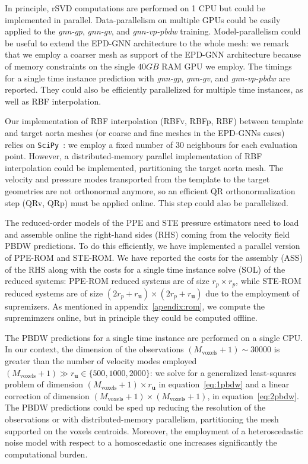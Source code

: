 In principle, rSVD computations are performed on 1 CPU but could be implemented in parallel. Data-parallelism on multiple GPUs could be easily applied to the \textit{gnn-gp}, \textit{gnn-gv}, and \textit{gnn-vp-pbdw} training. Model-parallelism could be useful to extend the EPD-GNN architecture to the whole mesh: we remark that we employ a coarser mesh as support of the EPD-GNN architecture because of memory constraints on the single $40GB$ RAM GPU we employ. The timings for a single time instance prediction with \textit{gnn-gp}, \textit{gnn-gv}, and \textit{gnn-vp-pbdw} are reported. They could also be efficiently parallelized for multiple time instances, as well as RBF interpolation.

Our implementation of RBF interpolation (RBFv, RBFp, RBF) between template and target aorta meshes (or coarse and fine meshes in the EPD-GNNs cases) relies on \texttt{SciPy}~\cite{2020SciPy-NMeth}: we employ a fixed number of $30$ neighbours for each evaluation point. However, a distributed-memory parallel implementation of RBF interpolation could be implemented, partitioning the target aorta mesh. The velocity and pressure modes transported from the template to the target geometries are not orthonormal anymore, so an efficient QR orthonormalization step (QRv, QRp) must be applied online. This step could also be parallelized.

The reduced-order models of the PPE and STE pressure estimators need to load and assemble online the right-hand sides (RHS) coming from the velocity field PBDW predictions. To do this efficiently, we have implemented a parallel version of PPE-ROM and STE-ROM. We have reported the costs for the assembly (ASS) of the RHS along with the costs for a single time instance solve (SOL) of the reduced systems: PPE-ROM reduced systems are of size $r_p\times r_p$, while STE-ROM reduced systems are of size $(2r_p+r_{\mathbf u})\times (2r_p+r_{\mathbf u})$ due to the employment of supremizers. As mentioned in appendix~\ref{apendix:rom}, we compute the supremimzers online, but in principle they could be computed offline.

The PBDW predictions for a single time instance are performed on a single CPU. In our context, the dimension of the observations $(M_{\text{voxels}}+1)\sim30000$ is greater than the number of velocity modes employed $(M_{\text{voxels}}+1)\gg r_{\mathbf u}\in\{500, 1000, 2000\}$: we solve for a generalized least-squares problem of dimension $(M_{\text{voxels}}+1)\times r_{\mathbf u}$ in equation~\eqref{eq:1pbdw} and a linear correction of dimension $(M_{\text{voxels}}+1)\times(M_{\text{voxels}}+1)$, in equation~\eqref{eq:2pbdw}. The PBDW predictions could be sped up reducing the resolution of the observations or with distributed-memory parallelism, partitioning the mesh supported on the voxels centroids. Moreover, the employment of a heteroscedastic noise model with respect to a homoscedastic one increases significantly the computational burden.

